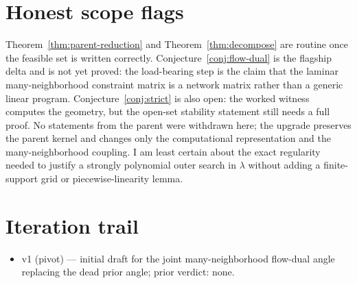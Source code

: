 \documentclass[11pt]{article}
\theoremstyle{definition}
\theoremstyle{plain}
\theoremstyle{remark}
\begin{document}
\section{Honest scope flags}
Theorem~\ref{thm:parent-reduction} and Theorem~\ref{thm:decompose} are routine once the feasible
set is written correctly. Conjecture~\ref{conj:flow-dual} is the flagship delta and is not yet
proved: the load-bearing step is the claim that the laminar many-neighborhood constraint matrix is
a network matrix rather than a generic linear program. Conjecture~\ref{conj:strict} is also open:
the worked witness computes the geometry, but the open-set stability statement still needs a full
proof. No statements from the parent were withdrawn here; the upgrade preserves the parent kernel
and changes only the computational representation and the many-neighborhood coupling. I am least
certain about the exact regularity needed to justify a strongly polynomial outer search in
\(\lambda\) without adding a finite-support grid or piecewise-linearity lemma.

\section{Iteration trail}
\begin{itemize}[leftmargin=*]
\item v1 (pivot) --- initial draft for the joint many-neighborhood flow-dual angle replacing the dead prior angle; prior verdict: none.
\end{itemize}
\end{document}
